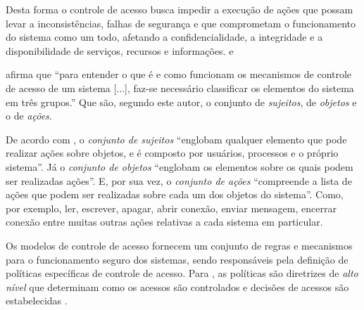 Desta forma o controle de acesso busca impedir a execução de ações que possam levar a inconsistências, falhas de segurança e que comprometam o funcionamento do sistema como um todo, afetando a confidencialidade, a integridade e a disponibilidade de serviços, recursos e informações.  \cite{samarati_access_2001} e \cite{sandhu:1996}

 afirma que ``para entender o que é e como funcionam os mecanismos de controle de acesso de um sistema [...], faz-se necessário classificar os elementos do sistema em três grupos.'' Que são, segundo este autor, o conjunto de \textit{sujeitos}, de \textit{objetos} e o de \textit{ações}.

De acordo com , o \textit{conjunto de sujeitos} ``englobam qualquer elemento que pode realizar ações sobre objetos, e é composto por usuários, processos e o próprio sistema''. Já o \textit{conjunto de objetos} ``englobam os elementos sobre os quais podem ser realizadas ações''. E, por sua vez, o \textit{conjunto de ações} ``compreende a lista de ações que podem ser realizadas sobre cada um dos objetos do sistema''. Como, por exemplo, ler, escrever, apagar, abrir conexão, enviar mensagem, encerrar conexão entre muitas outras ações relativas a cada sistema em particular.

Os modelos de controle de acesso fornecem um conjunto de regras e mecanismos para o funcionamento seguro dos sistemas, sendo responsáveis pela definição de políticas específicas de controle de acesso. Para , as políticas são diretrizes de \textit{alto nível} que determinam como os acessos são controlados e decisões de acessos são estabelecidas \cite{di_vimercati_policies_2005, samarati_access_2001, lopes_adopcao_2012}. 

